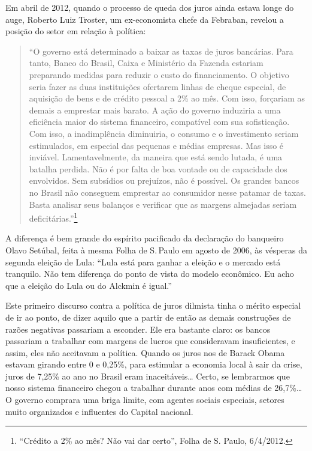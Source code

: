 Em abril de 2012, quando o processo de queda dos juros ainda estava
longe do auge, Roberto Luiz Troster, um ex-economista chefe da Febraban,
revelou a posição do setor em relação à política:

\begin{quote}
``O governo está determinado a baixar as taxas de juros bancárias. Para
tanto, Banco do Brasil, Caixa e Ministério da Fazenda estariam
preparando medidas para reduzir o custo do financiamento. O objetivo
seria fazer as duas instituições ofertarem linhas de cheque especial, de
aquisição de bens e de crédito pessoal a 2\% ao mês. Com isso, forçariam
as demais a emprestar mais barato. A ação do governo induziria a uma
eficiência maior do sistema financeiro, compatível com sua sofisticação.
Com isso, a inadimplência diminuiria, o consumo e o investimento seriam
estimulados, em especial das pequenas e médias empresas. Mas isso é
inviável. Lamentavelmente, da maneira que está sendo lutada, é uma
batalha perdida. Não é por falta de boa vontade ou de capacidade dos
envolvidos. Sem subsídios ou prejuízos, não é possível. Os grandes
bancos no Brasil não conseguem emprestar ao consumidor nesse patamar de
taxas. Basta analisar seus balanços e verificar que as margens almejadas
seriam deficitárias.''\footnote{``Crédito a 2\% ao mês? Não vai dar
  certo'', Folha de S. Paulo, 6/4/2012.}
\end{quote}

A diferença é bem grande do espírito pacificado da declaração do
banqueiro Olavo Setúbal, feita à mesma Folha de S.\,Paulo em agosto de
2006, às vésperas da segunda eleição de Lula: ``Lula está para ganhar a
eleição e o mercado está tranquilo. Não tem diferença do ponto de vista
do modelo econômico. Eu acho que a eleição do Lula ou do Alckmin é
igual.''

Este primeiro discurso contra a política de juros dilmista tinha o
mérito especial de ir ao ponto, de dizer aquilo que a partir de então as
demais construções de razões negativas passariam a esconder. Ele era
bastante claro: os bancos passariam a trabalhar com margens de lucros
que consideravam insuficientes, e assim, eles não aceitavam a política.
Quando os juros nos  de Barack Obama estavam girando entre 0 e
0,25\%, para estimular a economia local à sair da crise, juros de 7,25\%
ao ano no Brasil eram inaceitáveis… Certo, se lembrarmos que nosso
sistema financeiro chegou a trabalhar durante anos com médias de
26,7\%… O governo comprara uma briga limite, com agentes sociais
especiais, setores muito organizados e influentes do Capital nacional.

